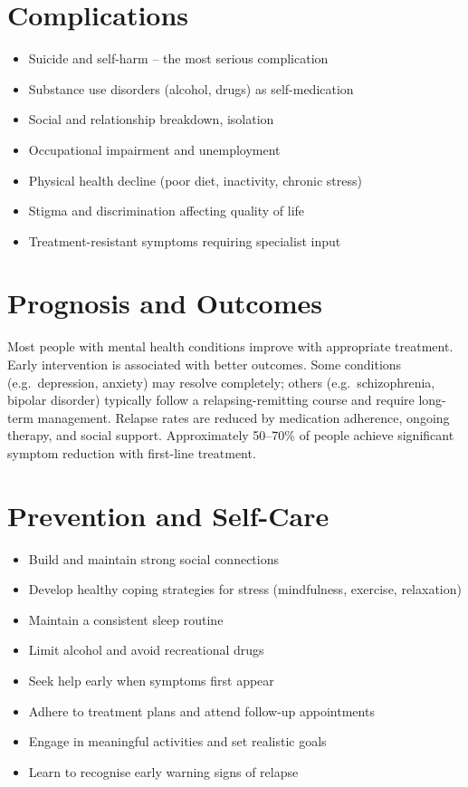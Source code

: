 \section*{Complications}
\begin{itemize}
    \item Suicide and self-harm -- the most serious complication
    \item Substance use disorders (alcohol, drugs) as self-medication
    \item Social and relationship breakdown, isolation
    \item Occupational impairment and unemployment
    \item Physical health decline (poor diet, inactivity, chronic stress)
    \item Stigma and discrimination affecting quality of life
    \item Treatment-resistant symptoms requiring specialist input
\end{itemize}

\section*{Prognosis and Outcomes}
Most people with mental health conditions improve with appropriate treatment. Early intervention is associated with better outcomes. Some conditions (e.g.\ depression, anxiety) may resolve completely; others (e.g.\ schizophrenia, bipolar disorder) typically follow a relapsing-remitting course and require long-term management. Relapse rates are reduced by medication adherence, ongoing therapy, and social support. Approximately 50--70\% of people achieve significant symptom reduction with first-line treatment.

\section*{Prevention and Self-Care}
\begin{itemize}
    \item Build and maintain strong social connections
    \item Develop healthy coping strategies for stress (mindfulness, exercise, relaxation)
    \item Maintain a consistent sleep routine
    \item Limit alcohol and avoid recreational drugs
    \item Seek help early when symptoms first appear
    \item Adhere to treatment plans and attend follow-up appointments
    \item Engage in meaningful activities and set realistic goals
    \item Learn to recognise early warning signs of relapse
\end{itemize}
